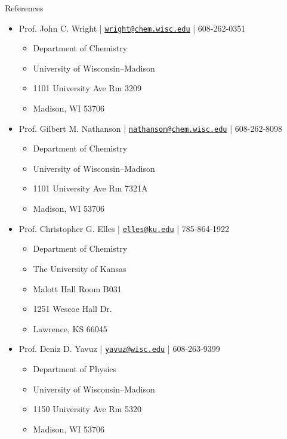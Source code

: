 \documentclass{resume} %
\begin{document}
\pagebreak

\begin{rSection}{References}
	\begin{itemize}[leftmargin = 0 pt]
		\item Prof. John C. Wright | \href{mailto:wright@chem.wisc.edu}{\texttt{wright@chem.wisc.edu}} | 608-262-0351
		\begin{itemize}
			\item[] Department of Chemistry
			\item[] University of Wisconsin--Madison
			\item[] 1101 University Ave Rm 3209
			\item[] Madison, WI 53706
		\end{itemize}	
		\item Prof. Gilbert M. Nathanson | \href{mailto:nathanson@chem.wisc.edu}{\texttt{nathanson@chem.wisc.edu}} | 608-262-8098
		\begin{itemize}
			\item[] Department of Chemistry
			\item[] University of Wisconsin--Madison
			\item[] 1101 University Ave Rm 7321A
			\item[] Madison, WI 53706
		\end{itemize}
		\item Prof. Christopher G. Elles | \href{mailto:elles@ku.edu}{\texttt{elles@ku.edu}} | 785-864-1922
		\begin{itemize}
			\item[] Department of Chemistry
			\item[] The University of Kansas
			\item[] Malott Hall Room B031
			\item[] 1251 Wescoe Hall Dr.
			\item[] Lawrence, KS 66045 
		\end{itemize}		
		\item Prof. Deniz D. Yavuz | 	\href{mailto:yavuz@wisc.edu}{\texttt{yavuz@wisc.edu}} | 608-263-9399
		\begin{itemize}
			\item[] Department of Physics
			\item[] University of Wisconsin--Madison
			\item[] 1150 University Ave Rm 5320
			\item[] Madison, WI 53706
		\end{itemize}
	\end{itemize}
\end{rSection}
\end{document}
